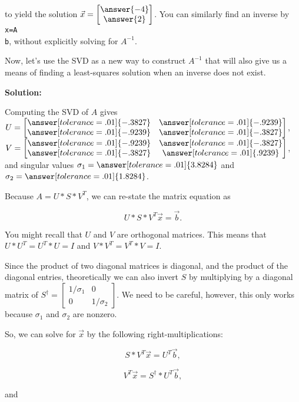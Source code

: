 \documentclass{ximera}
\begin{document}
\begin{example}
\begin{verbatim}
\end{verbatim}


to yield the solution  $\vec{x}=\begin{bmatrix}
  \answer{-4}\\\answer{2}
\end{bmatrix}$. You can similarly find an inverse by \texttt{x=A\\b}, without explicitly solving for $A^{-1}$.

Now, let's use the SVD as a new way to construct $A^{-1}$ that will also give us a means of finding a least-squares solution when an inverse does not exist. 

\textbf{Solution:}

Computing the SVD of $A$ gives $U=\begin{bmatrix}
  \answer[tolerance=.01]{-.3827} & \answer[tolerance=.01]{-.9239}\\
  \answer[tolerance=.01]{-.9239} & \answer[tolerance=.01]{-.3827}
\end{bmatrix}$,  
$V=\begin{bmatrix}
  \answer[tolerance=.01]{-.9239} & \answer[tolerance=.01]{-.3827}\\
  \answer[tolerance=.01]{-.3827} & \answer[tolerance=.01]{.9239}
\end{bmatrix}$,  
and singular values $\sigma_1=\answer[tolerance=.01]{3.8284}$ and $\sigma_2=\answer[tolerance=.01]{1.8284}$.

Because $A=U*S*V^T$, we can re-state the matrix equation as 

$$U*S*V^T\vec{x}=\vec{b}.$$

You might recall that $U$ and $V$ are orthogonal matrices. This means that $U*U^T=U^T*U=I$ and $V*V^T=V^T*V=I$. 

Since the product of two diagonal matrices is diagonal, and the product of the diagonal entries, theoretically we can also invert $S$ by multiplying by a diagonal matrix of $S^\dagger=\begin{bmatrix}
  1/\sigma_1 & 0\\0 & 1/\sigma_2
\end{bmatrix}$. We need to be careful, however, this only works because $\sigma_1$ and $\sigma_2$ are nonzero. 

So, we can solve for $\vec{x}$ by the following right-multiplications:

$$S*V^T\vec{x}=U^T\vec{b},$$

$$V^T\vec{x}=S^\dagger*U^T\vec{b},$$

and


\end{example}
\end{document}
